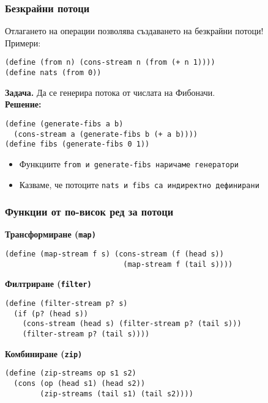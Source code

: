 \documentclass{beamer}
\begin{document}
\begin{frame}[fragile]
  \frametitle{Безкрайни потоци}
  Отлагането на операции позволява създаването на \alert{безкрайни потоци}!\\[1em]
  \pause
  Примери:
\begin{verbatim}
(define (from n) (cons-stream n (from (+ n 1))))
(define nats (from 0))
\end{verbatim}
  \pause
  \textbf{Задача.} Да се генерира потока от числата на Фибоначи.\\
  \pause
  \textbf{Решение:}
\begin{verbatim}
(define (generate-fibs a b)
  (cons-stream a (generate-fibs b (+ a b))))
(define fibs (generate-fibs 0 1))
\end{verbatim}
  \pause
  \begin{itemize}
  \item Функциите \tt{from} и \tt{generate-fibs} наричаме \alert{генератори}
  \item Казваме, че потоците \tt{nats} и \tt{fibs} са \alert{индиректно дефинирани}
  \end{itemize}
\end{frame}

\begin{frame}
  \frametitle{Функции от по-висок ред за потоци}
  \textbf{Трансформиране (\tt{map})}
\begin{verbatim}
(define (map-stream f s) (cons-stream (f (head s))
                           (map-stream f (tail s))))
\end{verbatim}
  \pause
  \textbf{Филтриране (\tt{filter})}
\begin{verbatim}
(define (filter-stream p? s)
  (if (p? (head s))
    (cons-stream (head s) (filter-stream p? (tail s)))
    (filter-stream p? (tail s))))
\end{verbatim}
  \pause
  \textbf{Комбиниране (\tt{zip})}
\begin{verbatim}
(define (zip-streams op s1 s2)
  (cons (op (head s1) (head s2))
        (zip-streams (tail s1) (tail s2))))
\end{verbatim}
\end{frame}
\end{document}
